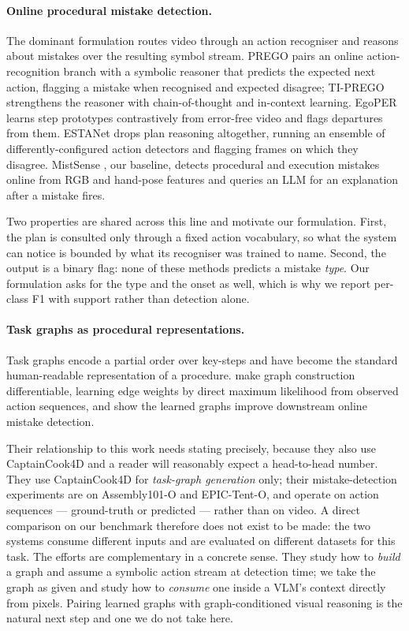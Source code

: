 \documentclass[10pt,twocolumn]{article}
\begin{document}
\paragraph{Online procedural mistake detection.}
The dominant formulation routes video through an action recogniser and reasons
about mistakes over the resulting symbol stream. PREGO
\citep{flaborea2024prego} pairs an online action-recognition branch with a
symbolic reasoner that predicts the expected next action, flagging a mistake
when recognised and expected disagree; TI-PREGO \citep{plini2024tiprego}
strengthens the reasoner with chain-of-thought and in-context learning. EgoPER
\citep{lee2024egoper} learns step prototypes contrastively from error-free video
and flags departures from them. ESTANet \citep{lee2026estanet} drops plan
reasoning altogether, running an ensemble of differently-configured action
detectors and flagging frames on which they disagree. MistSense
\citep{patsch2025mistsense}, our baseline, detects procedural and execution
mistakes online from RGB and hand-pose features and queries an LLM for an
explanation after a mistake fires.

Two properties are shared across this line and motivate our formulation. First,
the plan is consulted only through a fixed action vocabulary, so what the system
can notice is bounded by what its recogniser was trained to name. Second, the
output is a binary flag: none of these methods predicts a mistake \emph{type}.
Our formulation asks for the type and the onset as well, which is why we report
per-class F1 with support rather than detection alone.

\paragraph{Task graphs as procedural representations.}
Task graphs encode a partial order over key-steps and have become the standard
human-readable representation of a procedure.
\citet{seminara2024taskgraph} make graph construction differentiable, learning
edge weights by direct maximum likelihood from observed action sequences, and
show the learned graphs improve downstream online mistake detection.

Their relationship to this work needs stating precisely, because they also use
CaptainCook4D and a reader will reasonably expect a head-to-head number. They
use CaptainCook4D for \emph{task-graph generation} only; their mistake-detection
experiments are on Assembly101-O and EPIC-Tent-O, and operate on action
sequences --- ground-truth or predicted --- rather than on video. A direct
comparison on our benchmark therefore does not exist to be made: the two systems
consume different inputs and are evaluated on different datasets for this task.
The efforts are complementary in a concrete sense. They study how to
\emph{build} a graph and assume a symbolic action stream at detection time; we
take the graph as given and study how to \emph{consume} one inside a VLM's
context directly from pixels. Pairing learned graphs with graph-conditioned
visual reasoning is the natural next step and one we do not take here.
\end{document}
